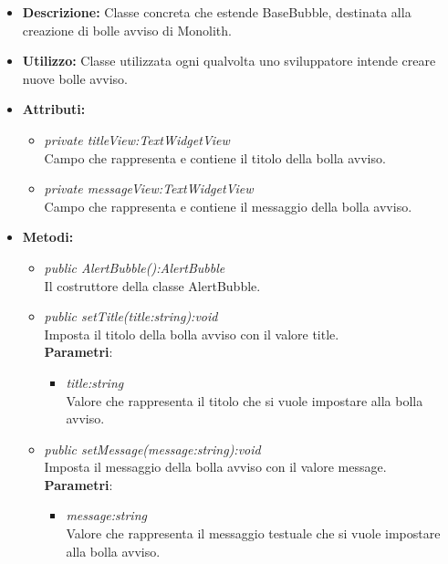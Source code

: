 \begin{itemize}
\item \textbf{Descrizione:} Classe concreta che estende BaseBubble, destinata alla creazione di bolle avviso di Monolith.
\item \textbf{Utilizzo:} Classe utilizzata ogni qualvolta uno sviluppatore intende creare nuove bolle avviso.
\item \textbf{Attributi:} 
\begin{itemize}
\item \textit{private titleView:TextWidgetView}\\
Campo che rappresenta e contiene il titolo della bolla avviso.
\item \textit{private messageView:TextWidgetView}\\
Campo che rappresenta e contiene il messaggio della bolla avviso.
\end{itemize}
\item \textbf{Metodi:}
\begin{itemize}
\item \textit{public AlertBubble():AlertBubble}\\
Il costruttore della classe AlertBubble.
\item \textit{public setTitle(title:string):void}\\
Imposta il titolo della bolla avviso con il valore title.
\\ \textbf{Parametri}: \begin{itemize}
\item \textit{title:string}\\
Valore che rappresenta il titolo che si vuole impostare alla bolla avviso.
\end{itemize}
\item \textit{public setMessage(message:string):void}\\
Imposta il messaggio della bolla avviso con il valore message.
\\ \textbf{Parametri}: \begin{itemize}
\item \textit{message:string}\\
Valore che rappresenta il messaggio testuale che si vuole impostare alla bolla avviso.
\end{itemize}
\end{itemize}
\end{itemize}
